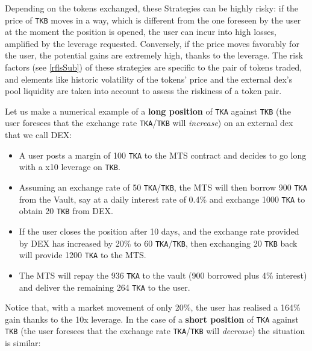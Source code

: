 \documentclass[a4paper,10 pt]{article}
\theoremstyle{definition}
\begin{document}
Depending on the tokens exchanged, these Strategies can be highly risky: if the price of \verb|TKB| moves in a way, which is different from the one foreseen by the user at the moment the position is opened, the user can incur into high losses, amplified by the leverage requested. Conversely, if the price moves favorably for the user, the potential gains are extremely high, thanks to the leverage. The risk factors (see \ref{rflsSub}) of these strategies are specific to the pair of tokens traded, and elements like historic volatility of the tokens' price and the external dex's pool liquidity are taken into account to assess the riskiness of a token pair.

Let us make a numerical example of a {\bf long position} of \verb|TKA| against \verb|TKB| (the user foresees that the exchange rate \verb|TKA|/\verb|TKB| will {\it increase}) on an external dex that we call DEX:

\begin{itemize}
\item A user posts a margin of 100 \verb|TKA| to the MTS contract and decides to go long with a x10 leverage on \verb|TKB|.
\item Assuming an exchange rate of 50 \verb|TKA|/\verb|TKB|, the MTS will then borrow 900 \verb|TKA| from the Vault, say at a daily interest rate of 0.4\% and exchange 1000 \verb|TKA| to obtain 20 \verb|TKB| from DEX. 
\item If the user closes the position after 10 days, and the exchange rate provided by DEX has increased by 20\% to 60 \verb|TKA|/\verb|TKB|, then exchanging 20 \verb|TKB| back will provide 1200 \verb|TKA| to the MTS.
\item The MTS will repay the 936 \verb|TKA| to the vault (900 borrowed plus 4\% interest) and deliver the remaining 264 \verb|TKA| to the user.
\end{itemize}

Notice that, with a market movement of only 20\%, the user has realised a 164\% gain thanks to the 10x leverage.
In the case of a {\bf short position} of \verb|TKA| against \verb|TKB| (the user foresees that the exchange rate \verb|TKA|/\verb|TKB| will {\it decrease}) the situation is similar:
\end{document}
